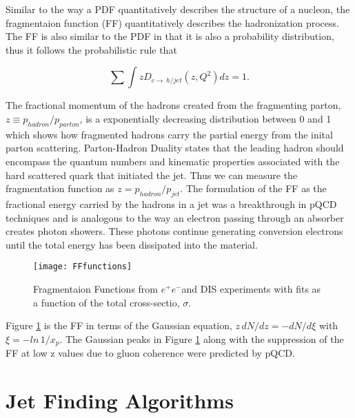 Similar to the way a PDF quantitatively describes the structure of a nucleon, the fragmentaion function (FF) quantitatively describes the hadronization process.  The FF is also similar to the PDF in that it is also a probability distribution, thus it follows the probabilistic rule that

\begin{equation}
\sum \int z D_{c \rightarrow \, h/jet} (z,Q^{2})dz = 1 .
\label{eq:FFRule}
\end{equation}

\noindent
The fractional momentum of the hadrons created from the fragmenting parton, $z \equiv p_{hadron} / p_{parton}$, is a exponentially decreasing distribution between 0 and 1 which shows how fragmented hadrons carry the partial energy from the inital parton scattering.  Parton-Hadron Duality\cite{Jenkovszky:2012dc} states that the leading hadron should encompass the quantum numbers and kinematic properties associated with the hard scattered quark that initiated the jet.  Thus we can measure the fragmentation function as $z = p_{hadron} / p_{jet}$.  The formulation of the FF as the fractional energy carried by the hadrons in a jet was a breakthrough in pQCD techniques and is analogous to the way an electron passing through an absorber creates photon showers. These photons continue generating conversion electrons until the total energy has been dissipated into the material.

\begin{figure}[h]
\texttt{[image: FFfunctions]}
\centering
\caption{Fragmentaion Functions from $e^{+}e^{-}$and DIS experiments with fits\cite{rak_tannenbaum_2013} as a function of the total cross-sectio, $\sigma$.}
\label{fig:FFfunc}
\end{figure}


Figure \ref{fig:FFfunc} is the FF in terms of the Gaussian equation, $z \, dN/dz = - dN /d \xi $ with $\xi = -ln  \,1/x_{p}$. The Gaussian peaks in Figure \ref{fig:FFfunc} along with the suppression of the FF at low z values due to gluon coherence were predicted by pQCD. 

\section{Jet Finding Algorithms}

